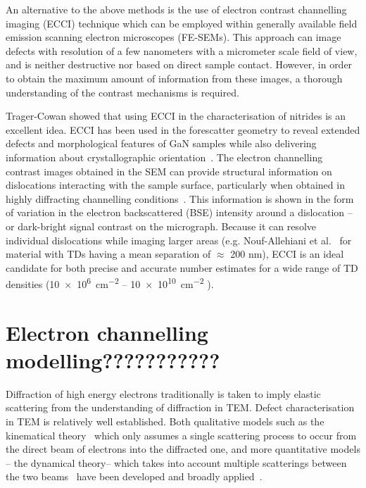 An alternative to the above methods is the use of electron contrast channelling imaging (ECCI) technique which can be employed within generally available field emission scanning electron microscopes (FE-SEMs). This approach can image defects with resolution of a few nanometers with a micrometer scale field of view, and is neither destructive nor based on direct sample contact. However, in order to obtain the maximum amount of information from these images, a thorough understanding of the contrast mechanisms is required.

Trager-Cowan \etal\cite{Carol} showed that using ECCI in the characterisation of nitrides is an excellent idea. ECCI has been used in the forescatter geometry to reveal extended defects and
morphological features of GaN samples while also delivering information about crystallographic orientation~\cite{Picard}. The electron channelling contrast images obtained in the SEM can provide structural information on dislocations  interacting with the sample surface, particularly when obtained in highly diffracting channelling conditions~\cite{Naresh}. This information is shown in the form of variation in the electron backscattered (BSE) intensity around a dislocation -- or dark-bright signal contrast on the micrograph. Because it can resolve individual dislocations while imaging larger areas (e.g. Nouf-Allehiani et al.~\cite{Nouf} for material with TDs having a mean separation of $\approx$ 200 nm), ECCI is an ideal candidate for both precise and accurate number estimates for a wide range of TD densities (\SI{10e6}{\centi \metre^{-2}} -- \SI{10e10}{\centi \metre^{-2}} ).


 
 \section{Electron channelling modelling???????????}
Diffraction of high energy electrons traditionally is taken to imply elastic scattering from the understanding of diffraction in TEM. Defect characterisation in TEM is relatively well established. Both qualitative models such as the kinematical theory~\cite{Hirsch60} which only assumes a single scattering process to occur from the direct beam of electrons into the diffracted one, and more quantitative models -- the dynamical theory-- which takes into account multiple scatterings between the two beams~\cite{Howie61} have been developed and broadly applied~\cite{Hirsch60,Clarke71,Spencer72}.

